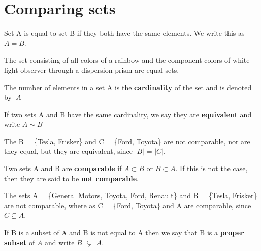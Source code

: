 \section{Comparing sets}
\begin{definition}
Set A is equal to set B if they both have the same elements. We write this as $A=B$.
\end{definition}

\begin{example}
The set consisting of all colors of a rainbow and the component colors of white light observer through a dispersion prism are equal sets.
\end{example}

\begin{definition}
The number of elements in a set A is the \textbf{cardinality} of the set and is denoted by $\left| A\right|$ 
\end{definition}

\begin{definition}
If two sets A and B have the same cardinality, we say they are \textbf{equivalent} and write $A \sim B$
\end{definition}

\begin{example}
The B = \{Tesla, Frisker\} and C = \{Ford, Toyota\} are not comparable, nor are they equal, but they are equivalent, since $\left| B\right|$ = $\left| C\right|$.
\end{example}

\begin{definition}
Two sets A and B are \textbf{comparable} if $A \subset B$ or $B \subset A$. If this is not the case, then they are said to be \textbf{not comparable}.
\end{definition}

\begin{example}
The sets A = \{General Motors, Toyota, Ford, Renault\} and B = \{Tesla, Frisker\} are not comparable, where as C = \{Ford, Toyota\} and A are comparable, since $C \subsetneq A$.
\end{example}

\begin{definition}
If B is a subset of A and B is not equal to A then we say that B is a \textbf{proper subset} of $A$ and write $B$ $\subsetneq$ $A$.
\end{definition}

